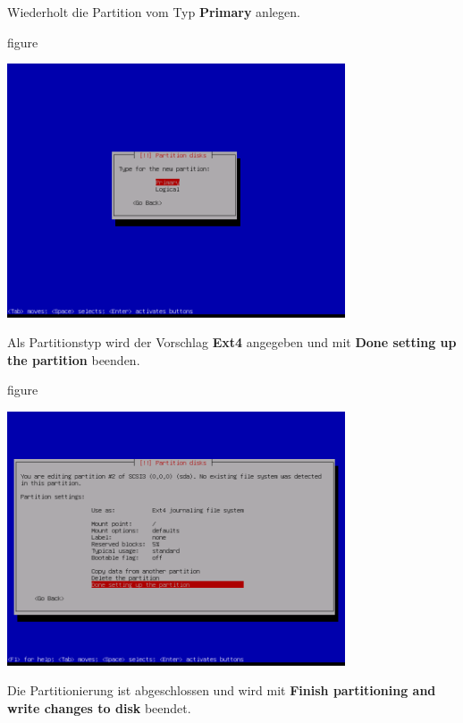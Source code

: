 Wiederholt die Partition vom Typ \textbf{Primary} anlegen.


\begin{nofloat}{figure}
\begin{center}
\includegraphics[width=0.75\textwidth]{screenshots/23_ubuntu_install.png}
\end{center}
\end{nofloat}

Als Partitionstyp wird der Vorschlag \textbf{Ext4} angegeben und mit
\textbf{Done setting up the partition} beenden.

\begin{nofloat}{figure}
\begin{center}
\includegraphics[width=0.75\textwidth]{screenshots/24_ubuntu_install.png}
\end{center}
\end{nofloat}
\newpage
Die Partitionierung ist abgeschlossen und wird mit \textbf{Finish partitioning
and write changes to disk} beendet.

